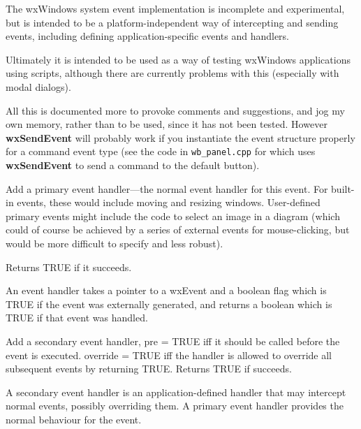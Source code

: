 The wxWindows system event implementation is incomplete and
experimental, but is intended to be a platform-independent way of
intercepting and sending events, including defining
application-specific events and handlers.

Ultimately it is intended to be used as a way of testing wxWindows
applications using scripts, although there are currently
problems with this (especially with modal dialogs).

All this is documented more to provoke comments and suggestions, and
jog my own memory, rather than to be used, since it has not been
tested. However {\bf wxSendEvent} will probably work if you
instantiate the event structure properly for a command event type (see
the code in {\tt wb\_panel.cpp} for \rtfsp
which uses {\bf wxSendEvent} to send a command to the default button).



Add a primary event handler---the normal event handler for this
event. For built-in events, these would include moving and resizing
windows. User-defined primary events might include the code to
select an image in a diagram (which could of course be achieved by a series
of external events for mouse-clicking, but would be more difficult to specify
and less robust).

Returns TRUE if it succeeds.

An event handler takes a pointer to a wxEvent and a boolean flag which is
TRUE if the event was externally generated, and returns a boolean which is
TRUE if that event was handled.



Add a secondary event handler, pre = TRUE iff it should be called before the
event is executed. override = TRUE iff the handler is allowed to override
all subsequent events by returning TRUE. Returns TRUE if succeeds.

A secondary event handler is an application-defined handler that may
intercept normal events, possibly overriding them. A primary event handler
provides the normal behaviour for the event.

